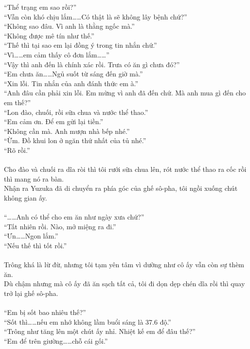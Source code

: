 \documentclass[12pt,a4paper, twosides]{book}
\begin{document}
“Thể trạng em sao rồi?”\\
“Vẫn còn khó chịu lắm……Có thật là sẽ không lây bệnh chứ?”\\
“Không sao đâu. Vì anh là thằng ngốc mà.”\\
“Không được mê tín như thế.”\\
“Thế thì tại sao em lại đồng ý trong tin nhắn chứ.”\\
“Vì……em cảm thấy cô đơn lắm……”\\
“Vậy thì anh đến là chính xác rồi. Trưa có ăn gì chưa đó?”\\
“Em chưa ăn……Ngủ suốt từ sáng đến giờ mà.”\\
“Xin lỗi. Tin nhắn của anh đánh thức em à.”\\
“Anh đâu cần phải xin lỗi. Em mừng vì anh đã đến chứ. Mà anh mua gì đến cho em thế?”\\
“Lon đào, chuối, rồi sữa chua và nước thể thao.”\\
“Em cảm ơn. Để em gửi lại tiền.”\\
“Không cần mà. Anh mượn nhà bếp nhé.”\\
“Ừm. Đồ khui lon ở ngăn thứ nhất của tủ nhé.”\\
“Rõ rồi.”\\
\\
Cho đào và chuối ra dĩa ròi thì tôi rưới sữa chua lên, rót nước thể thao ra cốc rồi thì mang nó ra bàn.\\
Nhận ra Yuzuka đã di chuyển ra phía góc của ghế sô-pha, tôi ngồi xuống chút không gian ấy.\\
\\
“……Anh có thể cho em ăn như ngày xưa chứ?”\\
“Tất nhiên rồi. Nào, mở miệng ra đi.”\\
“Ưn……Ngon lắm.”\\
“Nếu thế thì tốt rồi.”\\
\\
Trông khá là lừ đừ, nhưng tôi tạm yên tâm vì dường như cô ấy vẫn còn sự thèm ăn.\\
Dù chậm nhưng mà cô ấy đã ăn sạch tất cả, tôi đi dọn dẹp chén dĩa rồi thì quay trở lại ghế sô-pha.\\
\\
“Em bị sốt bao nhiêu thế?”\\
“Sốt thì……nếu em nhớ không lầm buổi sáng là 37.6 độ.”\\
“Trông như tăng lên một chút ấy nhỉ. Nhiệt kế em để đâu thế?”\\
“Em để trên giường……chỗ cái gối.”\\
\end{document}
